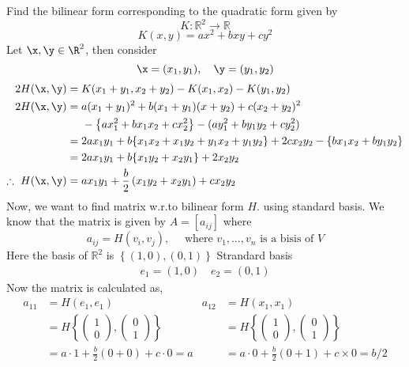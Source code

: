 \begin{example}
Find the bilinear form corresponding to the quadratic form given by 
$$K:\mathbb{R}^{2}\to \mathbb{R}$$
$$K(x,y)=ax^{2}+bxy+cy^{2}$$
Let $\x,\y\in \R^2$, then consider 
$$\x=(x_1,y_1),\quad \y=(y_1,y_2)$$
\begin{align*}
    2H(\x,\y)&=K(x_1+y_1,x_2+y_2)-K(x_1,x_2)-K(y_1,y_2)\\
    2H(\x,\y)&=a(x_1+y_1)^{2}+b(x_1+y_1)(x+y_2)+c(x_2+y_2)^{2}\\
    &\phantom{abc}-\left\{ax_1^{2}+bx_1x_2+cx_{2}^{2}\right\}-(ay_{1}^{2}+by_1y_2+cy_2^{2})\\
    &=2ax_1y_1+b\{x_1x_2+x_1y_2+y_1x_2+y_1y_2\}+2cx_2y_2-\left\{bx_1x_2+by_1y_2\right\} \\
    &=2ax_{1}y_1+b\{x_1y_2+x_2y_1\}+2x_{2}y_{2}\\
    \therefore ~H(\x,\y)&=ax_{1}y_1+\frac{b}{2}\left(x_1y_2+x_2y_1\right) +cx_{2}y_{2}
\end{align*}
Now, we want to find matrix w.r.to bilinear form $H.$ using standard basis. We know that the matrix is given by $A=[a_{ij}]$ where 
$$a_{ij}=H(v_i,v_j),\quad \text{ where }v_1,\ldots,v_n\text{ is a bisis of }V$$
Here the basis of $\mathbb{R}^{2}$ is $\left\{(1,0),(0,1)\right\}$
Strandard basis\\
\begin{align*}
    e_1=(1,0) \quad e_2=(0,1)
\end{align*}
Now the matrix is calculated as,
\begin{align*}
    a_{11}&=H(e_1,e_1) & a_{12} &=H(x_1,x_1)\\
    &=H\left\{\left(\begin{array}{c}
         1\\0
    \end{array}\right),\left(\begin{array}{c}
         0\\1 
    \end{array}\right)\right\} &&=H\left\{\left(\begin{array}{c}
         1  \\
         0
    \end{array}\right),\left(\begin{array}{c}
         0  \\
         1 
    \end{array}\right)\right\}\\
    &=a\cdot 1+\frac{b}{2}(0+0)+c\cdot 0=a &&=a\cdot 0+\frac{b}{2} (0+1)+c\times 0 =b/2\\[2em]

\end{align*}
\end{example}
